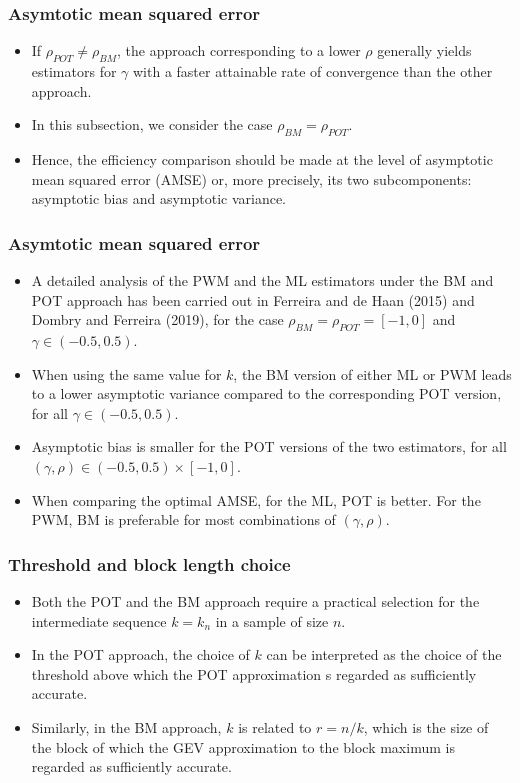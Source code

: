 \documentclass{beamer}
\begin{document}
\begin{frame}
    \frametitle{Asymtotic mean squared error}
\begin{itemize}
    \item If $\rho_{POT}\ne \rho_{BM}$, the approach corresponding to a lower $\rho$ generally yields estimators for $\gamma$ with a faster attainable rate of convergence than the other approach.
    \item In this subsection, we consider the case $\rho_{BM}=\rho_{POT}$.
    \item Hence, the efficiency comparison should be made at the level of asymptotic mean squared error
    (AMSE) or, more precisely, its two subcomponents: asymptotic bias and asymptotic variance.
\end{itemize}
    

\end{frame}

\begin{frame}
    \frametitle{Asymtotic mean squared error}

    \begin{itemize}
        \item A detailed analysis of the PWM and the ML estimators under the BM and POT approach has
        been carried out in Ferreira and de Haan (2015) and Dombry and Ferreira (2019), for the case $\rho_{BM}=\rho_{POT}=[-1,0]$ and $\gamma\in (-0.5,0.5)$.
        \item When using the same value for $k$, the BM version of either ML or PWM     leads to a lower asymptotic         variance compared to the corresponding POT version, for all $\gamma\in (-0.5,0.5)$.
        \item Asymptotic bias is smaller for the POT versions of the two estimators, for all $(\gamma,\rho)\in (-0.5,0.5)\times [-1,0]$.
        \item When comparing the optimal AMSE, for the ML, POT is better. For the PWM, BM is preferable for most combinations of $(\gamma,\rho)$.
    \end{itemize}

\end{frame}


\begin{frame}
    \frametitle{Threshold and block length choice}
\begin{itemize}
    \item Both the POT and the BM approach require a practical selection for the intermediate sequence $k=k_n$ in a sample of size $n$.
    \item In the POT approach, the choice of $k$ can be interpreted as
    the choice of the threshold above which the POT approximation s regarded as sufficiently
    accurate.
    \item Similarly, in the BM approach, $k$ is related to $r=n/k$, which is the size of the block
    of which the GEV approximation to the block maximum is regarded as sufficiently accurate.
\end{itemize}
    

\end{frame}
\end{document}

